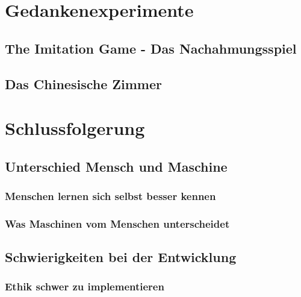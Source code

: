 \documentclass[12pt,german,ngerman]{report}
\begin{document}
\chapter{Gedankenexperimente}
    \section{The Imitation Game - Das Nachahmungsspiel}
    \section{Das Chinesische Zimmer}

\chapter{Schlussfolgerung}
    \section{Unterschied Mensch und Maschine}
        \subsection{Menschen lernen sich selbst besser kennen}
        \subsection{Was Maschinen vom Menschen unterscheidet}
    \section{Schwierigkeiten bei der Entwicklung}
        \subsection{Ethik schwer zu implementieren}

    \printbibliography[title={Quellenverzeichnis}]
\end{document}
